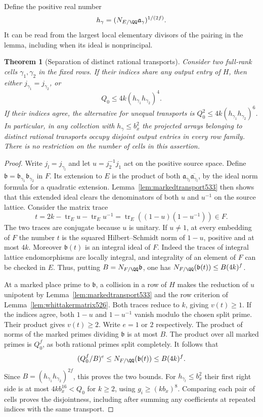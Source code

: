 \documentclass[a4paper,11pt]{article}
\newtheorem{theorem}[proposition]{Theorem}
\theoremstyle{definition}
\theoremstyle{remark}
\numberwithin{equation}{section}
\begin{document}
Define the positive real number
\[
       h_\gamma=(N_{E/\QQ}\mathfrak a_\gamma)^{1/(2f)} .
\]
It can be read from the largest local elementary divisors of
the pairing in the lemma, including when its ideal is
nonprincipal.

\begin{theorem}[Separation of distinct rational transports]
\leavevmode\label{thm:fullrankseparation533}
Consider two full-rank cells \(\gamma_1,\gamma_2\) in the
fixed rows. If their indices share any output entry of \(H\),
then either \(j_{\gamma_1}=j_{\gamma_2}\), or
\[
                  Q_0\le 4k(h_{\gamma_1}h_{\gamma_2})^4 .
\]
If their indices agree, the alternative for unequal transports
is \(Q_0^2\le4k(h_{\gamma_1}h_{\gamma_2})^6\).
In particular, in any collection with \(h_\gamma\le b_x^2\)
the projected arrays belonging to distinct rational transports
occupy disjoint output entries in every row family. There is
no restriction on the number of cells in this assertion.
\end{theorem}
\begin{proof}
Write \(j_l=j_{\gamma_l}\) and let \(u=j_2^{-1}j_1\) act on
the positive source space. Define
\(\mathfrak b=\mathfrak b_{\gamma_1}\mathfrak b_{\gamma_2}\)
in \(F\). Its extension to \(E\) is the product of both
\(\mathfrak a_{\gamma_l}\overline{\mathfrak a_{\gamma_l}}\),
by the ideal norm formula for a quadratic extension.
Lemma~\ref{lem:markedtransport533} then shows that this extended
ideal clears the denominators of both \(u\) and \(u^{-1}\) on
the source lattice. Consider the matrix trace
\[
       t=2k-\operatorname{tr}_E u-\operatorname{tr}_E u^{-1}
        =\operatorname{tr}_E((1-u)(1-u^{-1}))\in F .
\]
The two traces are conjugate because \(u\) is unitary. If
\(u\ne1\), at every embedding of \(F\) the number \(t\) is the
squared Hilbert--Schmidt norm of \(1-u\), positive and at most
\(4k\). Moreover \(\mathfrak b(t)\) is an integral ideal of \(F\).
Indeed the traces of integral lattice endomorphisms are locally integral,
and integrality of an element of \(F\) can be checked in \(E\).
Thus, putting \(B=N_{F/\QQ}\mathfrak b\), one has
\(N_{F/\QQ}(\mathfrak b(t))\le B(4k)^f\).

At a marked place prime to \(\mathfrak b\), a collision in a
row of \(H\) makes the reduction of \(u\) unipotent by
Lemma~\ref{lem:markedtransport533} and the row criterion of
Lemma~\ref{lem:whittakermatrix526}. Both traces reduce to \(k\),
giving \(v(t)\ge1\). If the indices agree, both \(1-u\)
and \(1-u^{-1}\) vanish modulo the chosen split prime. Their
product gives \(v(t)\ge2\). Write \(e=1\) or \(2\) respectively.
The product of norms of the marked primes dividing \(\mathfrak b\)
is at most \(B\). The product over all marked primes is \(Q_0^f\),
as both rational primes split completely. It follows that
\[
         (Q_0^f/B)^e\le N_{F/\QQ}(\mathfrak b(t))
                   \le B(4k)^f .
\]
Since \(B=(h_{\gamma_1}h_{\gamma_2})^{2f}\), this proves the
two bounds. For \(h_{\gamma_l}\le b_x^2\) their first right
side is at most \(4k b_x^{16}<Q_0\) for \(k\ge2\), using
\(g_i\ge(kb_x)^8\). Comparing each pair of cells proves the
disjointness, including after summing any coefficients at
repeated indices with the same transport.
\end{proof}
\end{document}
